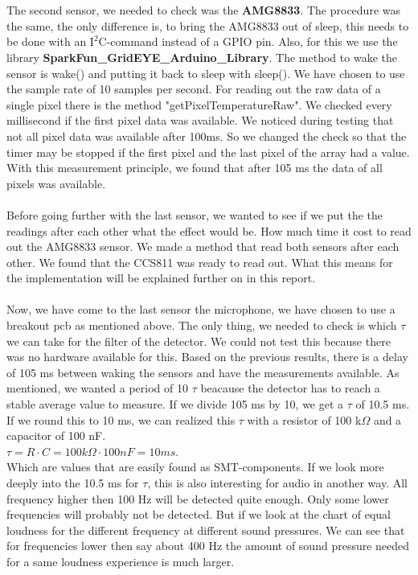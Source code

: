 \documentclass[11pt,a4paper]{article}
\begin{document}
\\ \\
 The second sensor, we needed to check was the \textbf{AMG8833}. The procedure was the same, the only difference is, to bring the AMG8833 out of sleep, this needs to be done with an $\text{I}^2$C-command instead of a GPIO pin. Also, for this we use the library \textbf{SparkFun\_GridEYE\_Arduino\_Library}. The method to wake the sensor is wake() and putting it back to sleep with sleep(). We have chosen to use the sample rate of 10 samples per second. For reading out the raw data of a single pixel there is the method "getPixelTemperatureRaw". We checked every millisecond if the first pixel data was available. We noticed during testing that not all pixel data was available after 100ms. So we changed the check so that the timer may be stopped if the first pixel and the last pixel of the array had a value. With this measurement principle, we found that after 105 ms the data of all pixels was available.
\\ \\  
Before going further with the last sensor, we wanted to see if we put the the readings after each other what the effect would be. How much time it cost to read out the AMG8833 sensor. We made a method that read both sensors after each other. We found that the CCS811 was ready to read out. What this means for the implementation will be explained further on in this report. 
\\  \\ Now, we have come to the last sensor the microphone, we have chosen to use a breakout pcb as mentioned above. The only thing, we needed to check is which $\tau$ we can take for the filter of the detector. We could not test this because there was no hardware available for this. Based on the previous results, there is a delay of 105 ms between waking the sensors and have the measurements available. As mentioned, we wanted a period of 10 $\tau$ beacause the detector has to reach a stable average value to measure. If we divide 105 ms  by 10, we get  a $\tau$ of 10.5 ms. If we round this to 10 ms, we can realized this $\tau$ with a resistor of 100 k$\Omega$ and a capacitor of 100 nF.\\
$\tau= R \cdot C =  100 k\Omega \cdot 100 nF= 10 ms$.\\
Which are values that are easily found as SMT-components. If we look more deeply into the 10.5 ms for $\tau$, this is also interesting for audio in another way. All frequency higher then 100 Hz will be detected quite enough. Only some lower frequencies will probably not be detected. But if we look at the chart of equal loudness for the different frequency at different sound pressures. We can see that for frequencies lower then say about 400 Hz the amount of sound pressure needed for a same loudness experience is much larger. 
\end{document}
